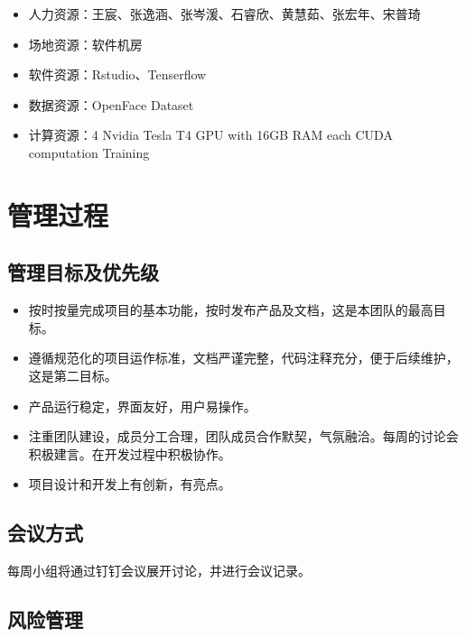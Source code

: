\documentclass[
  hyperref, a4paper]{ctexart}
\providecommand{\tightlist}{%
  \setlength{\itemsep}{0pt}\setlength{\parskip}{0pt}}
\begin{document}
\begin{itemize}
\tightlist
\item
  人力资源：王宸、张逸涵、张岑湲、石睿欣、黄慧茹、张宏年、宋普琦
\item
  场地资源：软件机房
\item
  软件资源：Rstudio、Tenserflow
\item
  数据资源：OpenFace Dataset
\item
  计算资源：4 Nvidia Tesla T4 GPU with 16GB RAM each CUDA computation
  Training
\end{itemize}

\hypertarget{ux7ba1ux7406ux8fc7ux7a0b}{%
\section{管理过程}\label{ux7ba1ux7406ux8fc7ux7a0b}}

\hypertarget{ux7ba1ux7406ux76eeux6807ux53caux4f18ux5148ux7ea7}{%
\subsection{管理目标及优先级}\label{ux7ba1ux7406ux76eeux6807ux53caux4f18ux5148ux7ea7}}

\begin{itemize}
\tightlist
\item
  按时按量完成项目的基本功能，按时发布产品及文档，这是本团队的最高目标。
\item
  遵循规范化的项目运作标准，文档严谨完整，代码注释充分，便于后续维护，这是第二目标。
\item
  产品运行稳定，界面友好，用户易操作。
\item
  注重团队建设，成员分工合理，团队成员合作默契，气氛融洽。每周的讨论会积极建言。在开发过程中积极协作。
\item
  项目设计和开发上有创新，有亮点。
\end{itemize}

\hypertarget{ux4f1aux8baeux65b9ux5f0f}{%
\subsection{会议方式}\label{ux4f1aux8baeux65b9ux5f0f}}

每周小组将通过钉钉会议展开讨论，并进行会议记录。

\hypertarget{ux98ceux9669ux7ba1ux7406}{%
\subsection{风险管理}\label{ux98ceux9669ux7ba1ux7406}}
\end{document}
